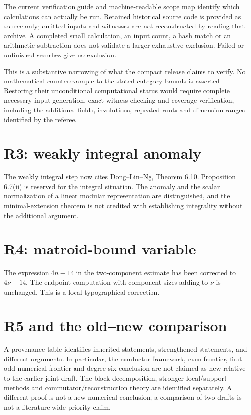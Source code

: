 \documentclass[11pt,a4paper]{article}
\begin{document}
The current verification guide and machine-readable scope map identify
which calculations can actually be run. Retained historical source code is
provided as source only; omitted inputs and witnesses are not reconstructed
by reading that archive. A completed small calculation, an input count,
a hash match or an arithmetic subtraction does not validate a larger
exhaustive exclusion. Failed or unfinished searches give no exclusion.

This is a substantive narrowing of what the compact release claims to
verify. No mathematical counterexample to the stated category bounds is
asserted. Restoring their unconditional computational status would require
complete necessary-input generation, exact witness checking and coverage
verification, including the additional fields, involutions, repeated roots
and dimension ranges identified by the referee.

\section*{R3: weakly integral anomaly}
The weakly integral step now cites Dong--Lin--Ng, Theorem 6.10. Proposition
6.7(ii) is reserved for the integral situation. The anomaly and the scalar
normalization of a linear modular representation are distinguished, and the
minimal-extension theorem is not credited with establishing integrality
without the additional argument.

\section*{R4: matroid-bound variable}
The expression $4n-14$ in the two-component estimate has been corrected to
$4\nu-14$. The endpoint computation with component sizes adding to $\nu$
is unchanged. This is a local typographical correction.

\section*{R5 and the old--new comparison}
A provenance table identifies inherited statements, strengthened statements,
and different arguments. In particular, the conductor framework, even
frontier, first odd numerical frontier and degree-six conclusion are not
claimed as new relative to the earlier joint draft. The block decomposition,
stronger local/support methods and commutator/reconstruction theory are
identified separately. A different proof is not a new numerical conclusion;
a comparison of two drafts is not a literature-wide priority claim.
\end{document}
